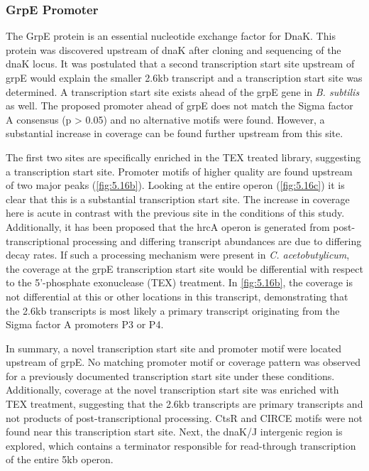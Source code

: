 \subsubsection{GrpE Promoter}
The GrpE protein is an essential nucleotide exchange factor for DnaK. This protein was discovered upstream of dnaK after cloning and sequencing of the dnaK locus\cite{80}. It was postulated that a second transcription start site upstream of grpE would explain the smaller 2.6kb transcript and a transcription start site was determined\cite{80}. A transcription start site exists ahead of the grpE gene in \textit{B. subtilis} as well\cite{81}. The proposed promoter ahead of grpE does not match the Sigma factor A consensus (p > 0.05) and no alternative motifs were found. However, a substantial increase in coverage can be found further upstream from this site. 

The first two sites are specifically enriched in the TEX treated library, suggesting a transcription start site. Promoter motifs of higher quality are found upstream of two major peaks (\ref{fig:5.16b}). Looking at the entire operon (\ref{fig:5.16c}) it is clear that this is a substantial transcription start site. The increase in coverage here is acute in contrast with the previous site in the conditions of this study. Additionally, it has been proposed that the hrcA operon is generated from post-transcriptional processing and differing transcript abundances are due to differing decay rates\cite{81}. If such a processing mechanism were present in \textit{C. acetobutylicum}, the coverage at the grpE transcription start site would be differential with respect to the 5'-phosphate exonuclease (TEX) treatment. In \ref{fig:5.16b}, the coverage is not differential at this or other locations in this transcript, demonstrating that the 2.6kb transcripts is most likely a primary transcript originating from the Sigma factor A promoters P3 or P4.

 In summary, a novel transcription start site and promoter motif were located upstream of grpE. No matching promoter motif or coverage pattern was observed for a previously documented transcription start site under these conditions. Additionally, coverage at the novel transcription start site was enriched with TEX treatment, suggesting that the 2.6kb transcripts are primary transcripts and not products of post-transcriptional processing. CtsR and CIRCE motifs were not found near this transcription start site. Next, the dnaK/J intergenic region is explored, which contains a terminator responsible for read-through transcription of the entire 5kb operon.

